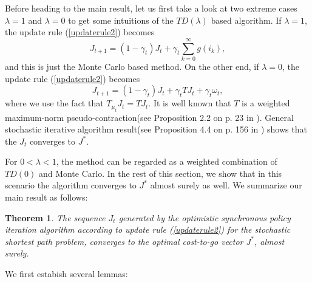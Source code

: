 \documentclass[12pt,a4paper]{amsart}
\numberwithin{equation}{section}
\theoremstyle{plain}
\newtheorem{Th}{Theorem}[section]
\theoremstyle{definition}
\begin{document}
Before heading to the main result, let us first take a look at two extreme cases $\lambda = 1$ and $\lambda = 0$ to get some intuitions of the $TD(\lambda)$ based algorithm. If $\lambda = 1$, the update rule (\ref{updaterule2}) becomes
$$
J_{t+1} = (1-\gamma_t) J_t + \gamma_t \sum_{k=0}^{\infty} g(i_k),
$$
and this is just the Monte Carlo based method. On the other end, if $\lambda = 0$, the update rule (\ref{updaterule2}) becomes
$$
J_{t+1} = (1-\gamma_t) J_t + \gamma_t TJ_t + \gamma_t \omega_t,
$$
where we use the fact that $T_{\mu_t} J_t = TJ_t$. It is well known that $T$ is a weighted maximum-norm pseudo-contraction(see Proposition 2.2 on p. 23 in \cite{BertsekasTsitsiklis96}). General stochastic iterative algorithm result(see Proposition 4.4 on p. 156 in \cite{BertsekasTsitsiklis96}) shows that the $J_t$ converges to $J^{*}$. 

For $ 0 < \lambda < 1$, the method can be regarded as a weighted combination of $TD(0)$ and Monte Carlo. In the rest of this section, we show that in this scenario the algorithm converges to $J^{*}$ almost surely as well. We summarize our main result as follows:

\begin{Th}\label{main2}
	The sequence $J_t$ generated by the optimistic synchronous policy iteration algorithm according to update rule (\ref{updaterule2}) for the  stochastic shortest path problem,  converges to the optimal cost-to-go vector $J^*$, almost surely. 
\end{Th}

We first estabish several lemmas:
\end{document}
